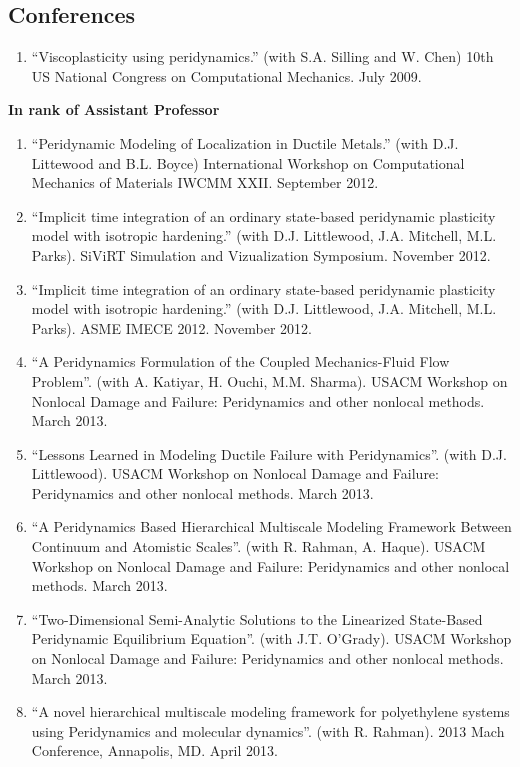 \subsection*{Conferences}

\ifdefined\iscockrell
\begin{enumerate}
    \item ``Viscoplasticity using peridynamics.''  (with S.A. Silling and W. Chen) 10th US National Congress on Computational Mechanics. July 2009.
\end{enumerate}
    \pagebreak[2]
    \textbf{In rank of Assistant Professor}
\begin{enumerate}[resume]
    \item ``Peridynamic Modeling of Localization in Ductile Metals.'' (with D.J. Littewood and B.L. Boyce)  International Workshop on Computational Mechanics of Materials IWCMM XXII. September 2012.
    \item ``Implicit time integration of an ordinary state-based peridynamic plasticity model with isotropic hardening.'' (with D.J. Littlewood, J.A. Mitchell, M.L. Parks).  SiViRT Simulation and Vizualization Symposium.  November 2012.
    \item ``Implicit time integration of an ordinary state-based peridynamic plasticity model with isotropic hardening.'' (with D.J. Littlewood, J.A. Mitchell, M.L. Parks).  ASME IMECE 2012.  November 2012.
    \item ``A Peridynamics Formulation of the Coupled Mechanics-Fluid Flow Problem''. (with A. Katiyar, H. Ouchi, M.M. Sharma). USACM Workshop on Nonlocal Damage and Failure: Peridynamics and other nonlocal methods. March 2013.
    \item ``Lessons Learned in Modeling Ductile Failure with Peridynamics''. (with D.J. Littlewood). USACM Workshop on Nonlocal Damage and Failure: Peridynamics and other nonlocal methods. March 2013.
    \item ``A Peridynamics Based Hierarchical Multiscale Modeling Framework Between Continuum and Atomistic Scales''. (with R. Rahman, A. Haque). USACM Workshop on Nonlocal Damage and Failure: Peridynamics and other nonlocal methods. March 2013.
    \item ``Two-Dimensional Semi-Analytic Solutions to the Linearized State-Based Peridynamic Equilibrium Equation''. (with J.T. O'Grady). USACM Workshop on Nonlocal Damage and Failure: Peridynamics and other nonlocal methods. March 2013.
    \item ``A novel hierarchical multiscale modeling framework for polyethylene systems using Peridynamics and molecular dynamics''. (with R. Rahman). 2013 Mach Conference, Annapolis, MD. April 2013. 

\end{enumerate}
